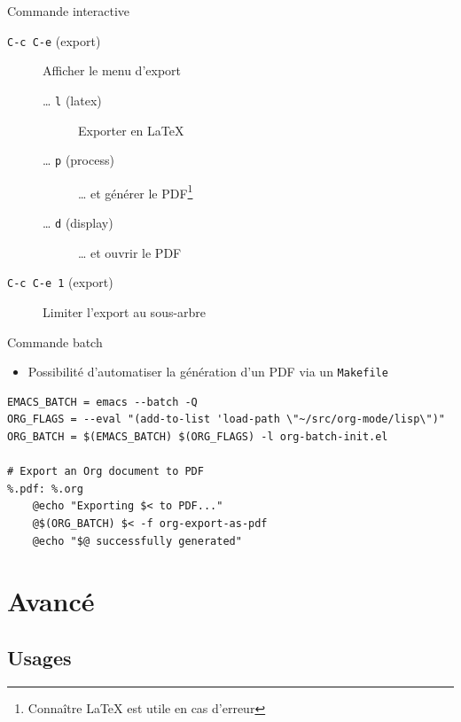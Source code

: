 \documentclass[presentation,t,hideothersubsections]{beamer}
\begin{document}
\begin{frame}[fragile,label=sec-4-2-1]{Commande interactive}
 \begin{description}
\item[\texttt{C-c C-e} (export)] Afficher le menu d'export
\begin{description}
\item[\ldots{} \texttt{l} (latex)] Exporter en \LaTeX{}
\item[\ldots{} \texttt{p} (process)] \ldots{} et générer le PDF\footnote{Connaître \LaTeX{} est utile en cas d'erreur}
\item[\ldots{} \texttt{d} (display)] \ldots{} et ouvrir le PDF
\end{description}

\item[\texttt{C-c C-e 1} (export)] Limiter l'export au sous-arbre
\end{description}
\end{frame}
\begin{frame}[fragile,label=sec-4-2-2]{Commande batch}
 \begin{itemize}
\item Possibilité d'automatiser la génération d'un PDF via un \verb~Makefile~
\end{itemize}

\lstset{language=sh,numbers=none}
\begin{lstlisting}
EMACS_BATCH = emacs --batch -Q
ORG_FLAGS = --eval "(add-to-list 'load-path \"~/src/org-mode/lisp\")"
ORG_BATCH = $(EMACS_BATCH) $(ORG_FLAGS) -l org-batch-init.el

# Export an Org document to PDF
%.pdf: %.org
	@echo "Exporting $< to PDF..."
	@$(ORG_BATCH) $< -f org-export-as-pdf
	@echo "$@ successfully generated"
\end{lstlisting}
\end{frame}
\section{Avancé}
\label{sec-5}

\subsection{Usages}
\label{sec-5-1}
\end{document}
